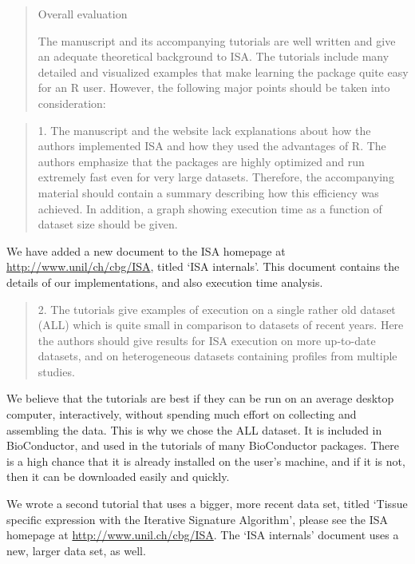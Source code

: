 \documentclass[a4paper]{article}
\newenvironment{myquote}{\begin{quote}\color{blue}}{\end{quote}}
\begin{document}
\begin{myquote}
Overall evaluation

The manuscript and its accompanying tutorials are well written and
give an adequate theoretical background to ISA. The tutorials include
many detailed and visualized examples that make learning the package
quite easy for an R user. However, the following major points should
be taken into consideration: 
\end{myquote}

\begin{myquote}
1.      The manuscript and the website lack explanations about how the
authors implemented ISA and how they used the advantages of R. The
authors emphasize that the packages are highly optimized and run
extremely fast even for very large datasets.  Therefore, the
accompanying material should contain a summary describing how this
efficiency was achieved. In addition, a graph showing execution time
as a function of dataset size should be given. 
\end{myquote}

We have added a new document to the ISA homepage at
\url{http://www.unil/ch/cbg/ISA}, titled `ISA internals'. This
document contains the details of our implementations, and also
execution time analysis.

\begin{myquote}
2.      The tutorials give examples of execution on a single rather
old dataset (ALL) which is quite small in comparison to datasets of
recent years. Here the authors should give results for ISA execution
on more up-to-date datasets, and on heterogeneous datasets containing
profiles from multiple studies. 
\end{myquote}

We believe that the tutorials are best if they can be run on an
average desktop computer, interactively, without spending much
effort on collecting and assembling the data. This is why we chose the
ALL dataset. It is included in BioConductor, and used in the tutorials
of many BioConductor packages. There is a high chance that it is
already installed on the user's machine, and if it is not, then it can
be downloaded easily and quickly.

We wrote a second tutorial that uses a bigger, more recent data set, 
titled `Tissue specific expression with the Iterative Signature
Algorithm', please see the ISA homepage at
\url{http://www.unil.ch/cbg/ISA}. The `ISA internals' document uses a
new, larger data set, as well.
\end{document}
